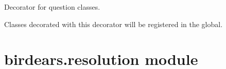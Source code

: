 \documentclass[letterpaper,10pt,english]{sphinxmanual}
\begin{document}

\begin{fulllineitems}
\label{\detokenize{birdears:birdears.questionbase.get_valid_pitches}}
\end{fulllineitems}


\begin{fulllineitems}
\label{\detokenize{birdears:birdears.questionbase.register_question_class}}
Decorator for question classes.

Classes decorated with this decorator will be registered in the
 global.

\end{fulllineitems}



\section{birdears.resolution module}
\label{\detokenize{birdears:module-birdears.resolution}}\label{\detokenize{birdears:birdears-resolution-module}}
\end{document}
